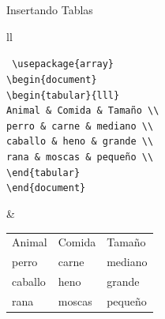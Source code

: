 \documentclass[12pt]{beamer}
\begin{document}
\begin{frame}{Insertando Tablas}
  \begin{tabular}{ll}
    \begin{minipage}{0.5\textwidth}
      \begin{block}{}
        \texttt{\color{blue}
          \textbackslash usepackage\{array\}\\
          \textbackslash begin\{document\}\\
          \textbackslash begin\{tabular\}\{lll\}\\          
          Animal  \& Comida \& Tamaño \textbackslash\textbackslash\\
          perro   \& carne  \& mediano \textbackslash\textbackslash\\
          caballo \& heno   \& grande  \textbackslash\textbackslash\\
          rana    \& moscas \& pequeño \textbackslash\textbackslash\\
          \textbackslash end\{tabular\}\\
          \textbackslash end\{document\}
        }
      \end{block}
    \end{minipage} &
    \begin{minipage}{0.5\textwidth}
      \begin{tabular}{lll}
        Animal  & Comida & Tamaño \\
        perro   & carne  & mediano \\
        caballo & heno   & grande \\
        rana    & moscas & pequeño \\
      \end{tabular}
    \end{minipage}
    \end{tabular}
\end{frame}
\end{document}
